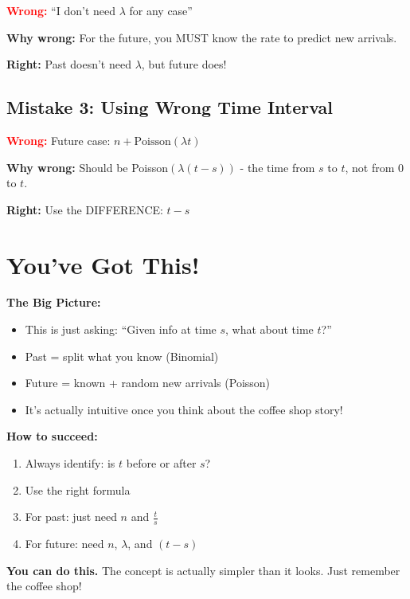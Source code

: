 \documentclass[11pt]{article}
\begin{document}
\textcolor{red}{\textbf{Wrong:}} ``I don't need $\lambda$ for any case''

\textbf{Why wrong:} For the future, you MUST know the rate to predict new arrivals.

\textcolor{green!60!black}{\textbf{Right:}} Past doesn't need $\lambda$, but future does!

\subsection{Mistake 3: Using Wrong Time Interval}

\textcolor{red}{\textbf{Wrong:}} Future case: $n + \text{Poisson}(\lambda t)$

\textbf{Why wrong:} Should be Poisson$(\lambda(t - s))$ - the time from $s$ to $t$, not from 0 to $t$.

\textcolor{green!60!black}{\textbf{Right:}} Use the DIFFERENCE: $t - s$

\section{You've Got This!}

\begin{tcolorbox}[colback=green!20!white,colframe=green!75!black]
\textbf{The Big Picture:}

\begin{itemize}
    \item This is just asking: ``Given info at time $s$, what about time $t$?''
    \item Past = split what you know (Binomial)
    \item Future = known + random new arrivals (Poisson)
    \item It's actually intuitive once you think about the coffee shop story!
\end{itemize}

\vspace{0.3cm}

\textbf{How to succeed:}
\begin{enumerate}
    \item Always identify: is $t$ before or after $s$?
    \item Use the right formula
    \item For past: just need $n$ and $\frac{t}{s}$
    \item For future: need $n$, $\lambda$, and $(t-s)$
\end{enumerate}

\vspace{0.3cm}

\textbf{You can do this.} The concept is actually simpler than it looks. Just remember the coffee shop!
\end{tcolorbox}
\end{document}
